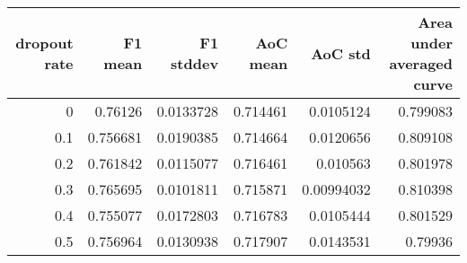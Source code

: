 \begin{tabular}{rrrrrr}
\toprule
   dropout rate &   F1 mean &   F1 stddev &   AoC mean &    AoC std &   Area under averaged curve \\
\midrule
            0   &  0.76126  &   0.0133728 &   0.714461 & 0.0105124  &                    0.799083 \\
            0.1 &  0.756681 &   0.0190385 &   0.714664 & 0.0120656  &                    0.809108 \\
            0.2 &  0.761842 &   0.0115077 &   0.716461 & 0.010563   &                    0.801978 \\
            0.3 &  0.765695 &   0.0101811 &   0.715871 & 0.00994032 &                    0.810398 \\
            0.4 &  0.755077 &   0.0172803 &   0.716783 & 0.0105444  &                    0.801529 \\
            0.5 &  0.756964 &   0.0130938 &   0.717907 & 0.0143531  &                    0.79936  \\
\bottomrule
\end{tabular}